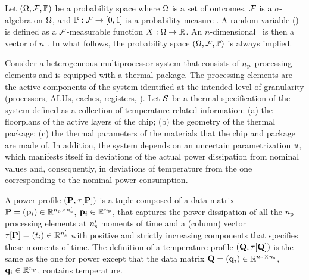 Let $(\Omega, \mathcal{F}, \mathbb{P})$ be a probability space where $\Omega$ is a set of outcomes, $\mathcal{F}$ is a $\sigma$-algebra on $\Omega$, and $\mathbb{P}: \mathcal{F} \to [0, 1]$ is a probability measure \cite{durrett2010}. A random variable (\rv) is defined as a $\mathcal{F}$-measurable function $X: \Omega \to \mathbb{R}$. An $n$-dimensional \rv\ is then a vector of $n$ \rvs. In what follows, the probability space $(\Omega, \mathcal{F}, \mathbb{P})$ is always implied.

Consider a heterogeneous multiprocessor system that consists of ${n_\text{p}}$ processing elements and is equipped with a thermal package. The processing elements are the active components of the system identified at the intended level of granularity (processors, ALUs, caches, registers, \etc).
Let $\mathcal{S}$ be a thermal specification of the system defined as a collection of temperature-related information: (a) the floorplans of the active layers of the chip; (b) the geometry of the thermal package; (c) the thermal parameters of the materials that the chip and package are made of.
In addition, the system depends on an uncertain parametrization $u$, which manifests itself in deviations of the actual power dissipation from nominal values and, consequently, in deviations of temperature from the one corresponding to the nominal power consumption.

A power profile $\profileP$ is a tuple composed of a data matrix $\mathbf{P} = (\mathbf{p}_i) \in \mathbb{R}^{{n_\text{p}} \times {n_\text{s}'}}$, $\mathbf{p}_i \in \mathbb{R}^{n_\text{p}}$, that captures the power dissipation of all the ${n_\text{p}}$ processing elements at ${n_\text{s}'}$ moments of time and a (column) vector $\tau[\mathbf{P}] = (t_i) \in \mathbb{R}^{{n_\text{s}'}}$ with positive and strictly increasing components that specifies these moments of time.
The definition of a temperature profile $\profileT$ is the same as the one for power except that the data matrix $\mathbf{Q} = (\mathbf{q}_i) \in \mathbb{R}^{{n_\text{p}} \times {n_\text{s}}}$, $\mathbf{q}_i \in \mathbb{R}^{n_\text{p}}$, contains temperature.

